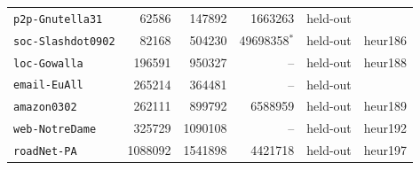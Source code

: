 \begin{tabular}{lrrrll}
\texttt{p2p-Gnutella31} & \num{62586} & \num{147892} & \num{1663263} & held-out &  \\
\texttt{soc-Slashdot0902} & \num{82168} & \num{504230} & \num{49698358}$^\ast$ & held-out & heur186 \\
\texttt{loc-Gowalla} & \num{196591} & \num{950327} & -- & held-out & heur188 \\
\texttt{email-EuAll} & \num{265214} & \num{364481} & -- & held-out &  \\
\texttt{amazon0302} & \num{262111} & \num{899792} & \num{6588959} & held-out & heur189 \\
\texttt{web-NotreDame} & \num{325729} & \num{1090108} & -- & held-out & heur192 \\
\texttt{roadNet-PA} & \num{1088092} & \num{1541898} & \num{4421718} & held-out & heur197 \\
\bottomrule
\end{tabular}
